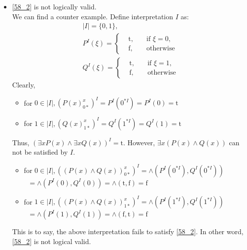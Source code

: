 \begin{enumerate}
\begin{itemize}
\newpage
\item \eqref{58_2} is not logically valid. \\
We can find a counter example. Define interpretation $I$ as:
\begin{equation*}
\begin{gathered}
|I| = \{0, 1\}, \\
P^I(\xi) = 
\left\{
        \begin{array}{ccc}      
        &\mathrm{t}, \quad &\text{if }  \xi = 0, \\
        &\mathrm{f}, \quad &\text{otherwise}
        \end{array}\right. \\
Q^I(\xi) = 
\left\{
        \begin{array}{ccc}      
        &\mathrm{t}, \quad &\text{if }  \xi = 1, \\
        &\mathrm{f}, \quad &\text{otherwise}
        \end{array}\right.       
\end{gathered}
\end{equation*}
Clearly, 
\begin{itemize}
\item \hspace{2cm} for $0 \in |I|, (P(x)_{0*}^x)^I = P^I(0^{*I}) = P^I(0) = \mathrm{t}$
\item \hspace{2cm} for $1 \in |I|, (Q(x)_{1*}^x)^I = Q^I(1^{*I}) = Q^I(1) = \mathrm{t}$
\end{itemize}
Thus, $(\exists x P(x) \wedge \exists x Q(x))^I = \mathrm{t}$. However, $\exists x (P(x) \wedge Q(x))$ can not be satisfied by $I$. 
\begin{itemize}
\item for $0 \in |I|, ((P(x) \wedge Q(x))_{0*}^x)^I = \wedge (P^I(0^{*I}), Q^I(0^{*I}))$ \\
           $~$\hspace{53.2mm} $= \wedge (P^I(0), Q^I(0)) = \wedge (\mathrm{t}, \mathrm{f}) = \mathrm{f}$ 
\item for $1 \in |I|, ((P(x) \wedge Q(x))_{1*}^x)^I= \wedge (P^I(1^{*I}), Q^I(1^{*I}))$ \\
           $~$\hspace{53.2mm} $= \wedge (P^I(1), Q^I(1)) = \wedge (\mathrm{f}, \mathrm{t}) = \mathrm{f}$ 
\end{itemize}
This is to say, the above interpretation fails to satisfy \eqref{58_2}. In other word, \eqref{58_2} is not logical valid. 
\end{itemize}
\end{enumerate}

